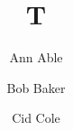 \documentclass{cas-sc}
\begin{document}
\title [mode = title]{T}
\author[a]{Ann Able}
\author[2]{Bob Baker}
\author[1]{Cid Cole}
\address[1]{Univ X}
\maketitle
\end{document}
